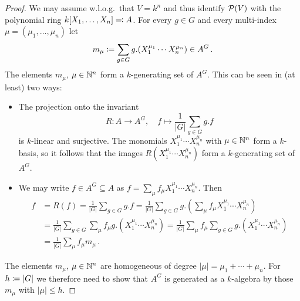\begin{proof}
  We may assume w.l.o.g.\ that $V = k^n$ and thus identify $\mathcal{P}(V)$ with the polynomial ring $k[X_1, \dotsc, X_n] \eqqcolon A$.
  For every $g \in G$ and every multi-index $\mu = (\mu_1, \dotsc, \mu_n)$ let
  \[
              m_\mu
    \coloneqq  \sum_{g \in G} g.(X_1^{\mu_1} \dotsm X_n^{\mu_n})
    \in       A^G \,.
  \]
  The elements $m_\mu$, $\mu \in \mathbb{N}^n$ form a $k$-generating set of $A^G$.
  This can be seen in (at least) two ways:
  \begin{itemize}
    \item
      The projection onto the invariant
      \[
                R
        \colon  A
        \to     A^G,
        \quad   f
        \mapsto \frac{1}{|G|} \sum_{g \in G} g.f
      \]
      is $k$-linear and surjective.
      The monomials $X_1^{\mu_1} \dotsm X_n^{\mu_n}$ with $\mu \in \mathbb{N}^n$ form a $k$-basis, so it follows that the images $R(X_1^{\mu_1} \dotsm X_n^{\mu_n})$ form a $k$-generating set of $A^G$.
    \item
      We may write $f \in A^G \subseteq A$ as $f = \sum_{\mu} f_\mu X_1^{\mu_1} \dotsm X_n^{\mu_n}$.
      Then
      \begin{align*}
            f
        &=  R(f)
         =  \frac{1}{|G|} \sum_{g \in G} g.f
         =  \frac{1}{|G|} \sum_{g \in G} g.\left( \sum_{\mu} f_\mu X_1^{\mu_1} \dotsm X_n^{\mu_n} \right) \\
        &=  \frac{1}{|G|} \sum_{g \in G} \sum_{\mu} f_\mu g.\left( X_1^{\mu_1} \dotsm X_n^{\mu_n} \right)
         =  \frac{1}{|G|} \sum_{\mu} f_\mu \sum_{g \in G} g.\left( X_1^{\mu_1} \dotsm X_n^{\mu_n} \right) \\
        &=  \frac{1}{|G|} \sum_{\mu} f_\mu m_\mu \,.
      \end{align*}
  \end{itemize}
  The elements $m_\mu$, $\mu \in \mathbb{N}^n$ are homogeneous of degree $|\mu| = \mu_1 + \dotsb + \mu_n$.
  For $h \coloneqq |G|$ we therefore need to show that $A^G$ is generated as a $k$-algebra by those $m_\mu$ with $|\mu| \leq h$.
  

\end{proof}
